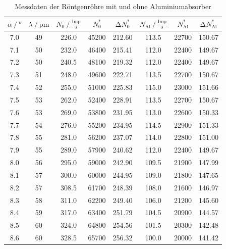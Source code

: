 \begin{table}[H]    
    \centering
    \caption{Messdaten der Röntgenröhre mit und ohne Aluminiumabsorber}
    \label{Tabelle2}
    \begin{tabular} {c  c|| c  c  c||  c  c  c}
        \toprule
        {$ \alpha \mathbin{/} \unit{\degree}$} &
        {$ \lambda \mathbin{/} \unit{\pico\meter}$} &
        {$ N_{0} \mathbin{/} \frac{\text{Imp}}{s} $} &
        {$ N^{*}_{0} $} &
        {$ \increment N^{*}_{0} $} &
        {$ N_{\text{Al}} \mathbin{/} \frac{\text{Imp}}{s} $} &
        {$ N^{*}_{\text{Al}}$} &
        {$ \increment N^{*}_{\text{Al}} $} \\
        \midrule
        7.0  & 49 & 226.0 & 45200 & 212.60 & 113.5 & 22700 & 150.67 \\ 
        7.1  & 50 & 232.0 & 46400 & 215.41 & 112.0 & 22400 & 149.67 \\ 
        7.2  & 50 & 240.5 & 48100 & 219.32 & 112.0 & 22400 & 149.67 \\ 
        7.3  & 51 & 248.0 & 49600 & 222.71 & 113.5 & 22700 & 150.67 \\ 
        7.4  & 52 & 255.0 & 51000 & 225.83 & 115.0 & 23000 & 151.66 \\  
        7.5  & 53 & 262.0 & 52400 & 228.91 & 113.5 & 22700 & 150.67 \\  
        7.6  & 53 & 269.0 & 53800 & 231.95 & 113.0 & 22600 & 150.33 \\  
        7.7  & 54 & 276.0 & 55200 & 234.95 & 114.5 & 22900 & 151.33 \\ 
        7.8  & 55 & 281.0 & 56200 & 237.07 & 114.0 & 22800 & 151.00 \\  
        7.9  & 55 & 289.0 & 57900 & 240.62 & 112.0 & 22400 & 149.67 \\  
        8.0  & 56 & 295.0 & 59000 & 242.90 & 109.5 & 21900 & 147.99 \\  
        8.1  & 57 & 300.0 & 60000 & 244.95 & 109.0 & 21800 & 147.65 \\ 
        8.2  & 57 & 308.5 & 61700 & 248.39 & 108.0 & 21600 & 146.97 \\ 
        8.3  & 58 & 311.0 & 62200 & 249.40 & 106.0 & 21200 & 145.60 \\ 
        8.4  & 59 & 317.0 & 63400 & 251.79 & 104.5 & 20900 & 144.57 \\ 
        8.5  & 60 & 324.0 & 64800 & 254.56 & 101.5 & 20300 & 142.48 \\ 
        8.6  & 60 & 328.5 & 65700 & 256.32 & 100.0 & 20000 & 141.42 \\ 

\end{tabular}
\end{table}
